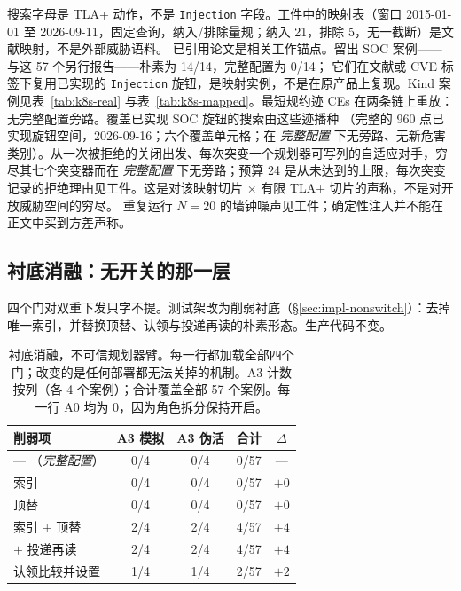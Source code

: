 \documentclass[acmsmall,manuscript,review,anonymous]{acmart}
\renewcommand{\_}{\discretionary{\textunderscore}{}{\textunderscore}}
\begin{document}
搜索字母是 TLA+ 动作，不是 \texttt{Injection} 字段。工件中的映射表（窗口 2015-01-01 至
2026-09-11，固定查询，纳入/排除量规；纳入 21，排除 5，无一截断）是文献映射，不是外部威胁语料。
已引用论文是相关工作锚点。留出 {SOC} 案例——与这 57 个另行报告——朴素为 14/14，完整配置为 0/14；
它们在文献或 {CVE} 标签下复用已实现的 \texttt{Injection} 旋钮，是映射实例，不是在原产品上复现。Kind 案例见表~\ref{tab:k8s-real} 与表~\ref{tab:k8s-mapped}。最短规约迹 {CEs} 在两条链上重放：无完整配置旁路。覆盖已实现 {SOC} 旋钮的搜索由这些迹播种
（完整的 960 点已实现旋钮空间，2026-09-16；六个覆盖单元格；在 \emph{完整配置} 下无旁路、无新危害类别）。从一次被拒绝的关闭出发、每次突变一个规划器可写列的自适应对手，穷尽其七个突变器而在 \emph{完整配置} 下无旁路；预算 24 是从未达到的上限，每次突变记录的拒绝理由见工件。这是对该映射切片 $\times$ 有限 {TLA+} 切片的声称，不是对开放威胁空间的穷尽。
重复运行 $N=20$ 的墙钟噪声见工件；确定性注入并不能在正文中买到方差声称。

\subsection{衬底消融：无开关的那一层}
\label{sec:eval-substrate}

四个门对双重下发只字不提。测试架改为削弱衬底（\S\ref{sec:impl-nonswitch}）：去掉唯一索引，并替换顶替、认领与投递再读的朴素形态。生产代码不变。

\begin{table}[t]
\centering
\small
\caption{衬底消融，不可信规划器臂。每一行都加载全部四个门；改变的是任何部署都无法关掉的机制。A3 计数按列（各 4 个案例）；合计覆盖全部 57 个案例。每一行 A0 均为 0，因为角色拆分保持开启。}
\label{tab:substrate}
\begin{tabular}{@{}lcccc@{}}
\hline
削弱项 & A3 模拟 & A3 伪活 & 合计 & $\Delta$\\
\hline
--- （\emph{完整配置}）                  & 0/4 & 0/4 & 0/57 & ---\\
索引                              & 0/4 & 0/4 & 0/57 & $+0$\\
顶替                          & 0/4 & 0/4 & 0/57 & $+0$\\
索引 $+$ 顶替                & 2/4 & 2/4 & 4/57 & $+4$\\
\quad $+$ 投递再读         & 2/4 & 2/4 & 4/57 & $+4$\\
认领比较并设置              & 1/4 & 1/4 & 2/57 & $+2$\\
\hline
\end{tabular}
\end{table}
\end{document}
